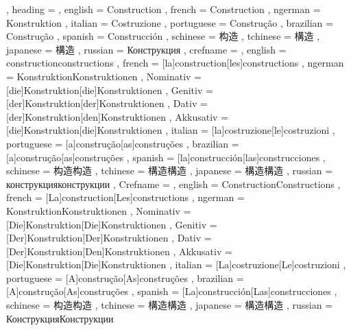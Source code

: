   {
    , heading =   {
                    , english     = Construction
                    , french      = Construction
                    , ngerman     = Konstruktion
                    , italian     = Costruzione
                    , portuguese  = Construção
                    , brazilian   = Construção
                    , spanish     = Construcción
                    , schinese    = 构造
                    , tchinese    = 構造
                    , japanese    = 構造
                    , russian     = Конструкция
                  }
    , crefname =  {
                    , english     = {construction}{constructions}
                    , french      = [la]{construction}[les]{constructions}
                    , ngerman     = { {Konstruktion}{Konstruktionen}
                                      , Nominativ = [die]{Konstruktion}[die]{Konstruktionen}
                                      , Genitiv   = [der]{Konstruktion}[der]{Konstruktionen}
                                      , Dativ     = [der]{Konstruktion}[den]{Konstruktionen}
                                      , Akkusativ = [die]{Konstruktion}[die]{Konstruktionen}
                                    }
                    , italian     = [la]{costruzione}[le]{costruzioni}
                    , portuguese  = [a]{construção}[as]{construções}
                    , brazilian   = [a]{construção}[as]{construções}
                    , spanish     = [la]{construcción}[las]{construcciones}
                    , schinese    = {构造}{构造}
                    , tchinese    = {構造}{構造}
                    , japanese    = {構造}{構造}
                    , russian     = {конструкция}{конструкции}
                  }
    , Crefname =  {
                    , english     = {Construction}{Constructions}
                    , french      = [La]{construction}[Les]{constructions}
                    , ngerman     = { {Konstruktion}{Konstruktionen}
                                      , Nominativ = [Die]{Konstruktion}[Die]{Konstruktionen}
                                      , Genitiv   = [Der]{Konstruktion}[Der]{Konstruktionen}
                                      , Dativ     = [Der]{Konstruktion}[Den]{Konstruktionen}
                                      , Akkusativ = [Die]{Konstruktion}[Die]{Konstruktionen}
                                    }
                    , italian     = [La]{costruzione}[Le]{costruzioni}
                    , portuguese  = [A]{construção}[As]{construções}
                    , brazilian   = [A]{construção}[As]{construções}
                    , spanish     = [La]{construcción}[Las]{construcciones}
                    , schinese    = {构造}{构造}
                    , tchinese    = {構造}{構造}
                    , japanese    = {構造}{構造}
                    , russian     = {Конструкция}{Конструкции}
                  }
  }

